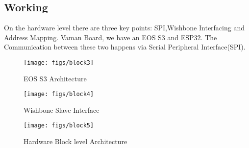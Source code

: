 \begin{enumerate}[label=\thesection.\arabic*.,ref=\thesection.\theenumi]
\subsection{Working }
On the hardware level there are three key points: SPI,Wishbone Interfacing and Address Mapping. Vaman Board, we have an EOS S3 and ESP32. The Communication between these two happens via Serial Peripheral Interface(SPI).\\
\vspace{0.25cm}

\begin{figure}[H]
\centering
\texttt{[image: figs/block3]}
\centering
\caption{EOS S3 Architecture }
\end{figure}

\begin{figure}[H]
\centering
\texttt{[image: figs/block4]}
\centering
\caption{Wishbone Slave Interface  }
\end{figure}
\begin{figure}[H]
\centering
\texttt{[image: figs/block5]}
\centering
\caption{Hardware Block level Architecture }
\end{figure}

\end{enumerate}